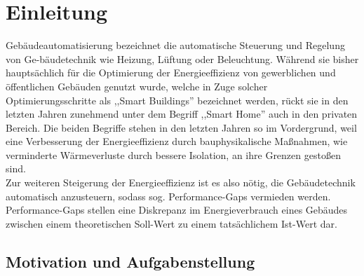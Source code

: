 \clearpage
\chapter{\textbf{Einleitung}}\label{einleitung}



Gebäudeautomatisierung bezeichnet die automatische Steuerung und Regelung von Ge-bäudetechnik 
wie Heizung, Lüftung oder Beleuchtung. Während sie bisher hauptsächlich für die Optimierung 
der Energieeffizienz von gewerblichen und öffentlichen Gebäuden genutzt wurde, welche in 
Zuge solcher Optimierungsschritte als ,,Smart Buildings'' bezeichnet werden, 
rückt sie in den letzten Jahren zunehmend unter dem Begriff ,,Smart Home'' auch in den privaten 
Bereich. Die beiden Begriffe stehen in den letzten Jahren so im Vordergrund, weil eine
Verbesserung der Energieeffizienz durch bauphysikalische Maßnahmen, wie verminderte 
Wärmeverluste durch bessere Isolation, an ihre Grenzen gestoßen sind.
\\
Zur weiteren Steigerung der Energieeffizienz ist es also nötig, die Gebäudetechnik
automatisch anzusteuern, sodass sog. Performance-Gaps vermieden werden. Performance-Gaps
stellen eine Diskrepanz im Energieverbrauch eines Gebäudes zwischen einem theoretischen 
Soll-Wert zu einem tatsächlichem Ist-Wert dar. 


\section{Motivation und Aufgabenstellung}

